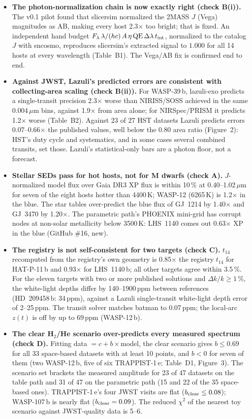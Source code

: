 \documentclass[11pt]{article}
\begin{document}
\begin{itemize}[leftmargin=*]
  \item \textbf{The photon-normalization chain is now exactly right (check B(i)).} The v0.1 pilot found that slicersim normalized the 2MASS $J$ (Vega) magnitudes as AB, making every host 2.3$\times$ too bright; that is fixed. An independent hand budget $F_\lambda\,\lambda/(hc)\,A\,\eta\,{\rm QE}\,\Delta\lambda\,t_{\rm int}$, normalized to the catalog $J$ with sncosmo, reproduces slicersim's extracted signal to $1.000$ for all 14 hosts at every wavelength (Table~B1). The Vega/AB fix is confirmed end to end.
  \item \textbf{Against JWST, Lazuli's predicted errors are consistent with collecting-area scaling (check B(ii)).} For WASP-39\,b, lazuli-exo predicts a single-transit precision 2.3$\times$ worse than NIRISS/SOSS achieved in the same 0.004\,$\mu$m bins, against 1.9$\times$ from area alone; for NIRSpec/PRISM it predicts 1.2$\times$ worse (Table~B2). Against 23 of 27 HST datasets Lazuli predicts errors 0.07--0.66$\times$ the published values, well below the 0.80 area ratio (Figure~2): HST's duty cycle and systematics, and in some cases several combined transits, set those. Lazuli's statistical-only bars are a photon floor, not a forecast.
  \item \textbf{Stellar SEDs pass for hot hosts, not for M dwarfs (check A).} $J$-normalized model flux over Gaia DR3 XP flux is within 10\,\% at 0.40--1.02\,$\mu$m for seven of the eight hosts hotter than 4400\,K; WASP-12 (6265\,K) is 1.2$\times$ in the blue. The star tables over-predict the blue flux of GJ~1214 by 1.40$\times$ and GJ~3470 by 1.20$\times$. The parametric path's PHOENIX mini-grid has corrupt nodes at non-solar metallicity below 3500\,K: LHS~1140 comes out 0.63$\times$ XP in the blue (GitHub \#16, new).
  \item \textbf{The registry is not self-consistent for two targets (check C).} $t_{14}$ recomputed from the registry's own geometry is 0.85$\times$ the registry $t_{14}$ for HAT-P-11\,b and 0.93$\times$ for LHS~1140\,b; all other targets agree within 3.5\,\%. For the eleven targets with two or more published solutions and $\Delta k/k\ge1$\,\%, the white-light depths differ by 140--1900\,ppm between references (HD~209458\,b: 34\,ppm), against a Lazuli single-transit white-light depth error of 2--25\,ppm. The transit solver matches batman to 0.07\,ppm; the local-arc $z(t)$ is off by up to 69\,ppm (WASP-12\,b).
  \item \textbf{The clear H$_2$/He scenario over-predicts every measured spectrum (check D).} Fitting data $= c + b\times$model, the clear scenario gives $b \le 0.69$ for all 33 space-based datasets with at least 10 points, and $b<0$ for seven of them (two WASP-12\,b, five of six TRAPPIST-1\,e; Table~D1, Figure~3). The scenario set brackets the measured amplitude for 23 of 47 datasets on the table path and 31 of 47 on the parametric path (15 and 22 of the 35 space-based ones). TRAPPIST-1\,e's four JWST visits are flat ($b_{\rm clear}\le 0.08$); WASP-107\,b is nearly flat ($b_{\rm clear}=0.09$). The reduced $\chi^2$ of the nearest toy scenario against JWST-quality data is 5--6.

\end{itemize}
\end{document}
